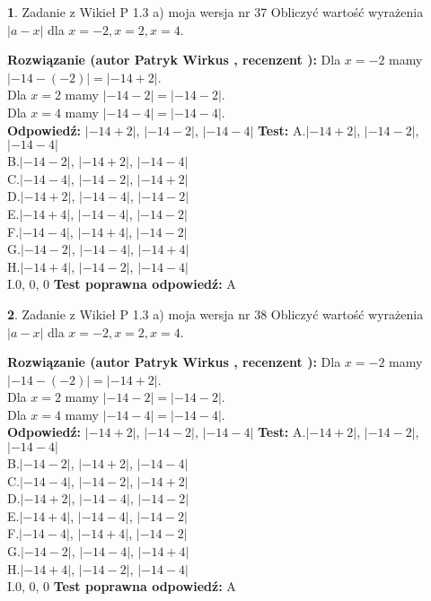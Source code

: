 \documentclass[12pt, a4paper]{article}
\theoremstyle{definition} %
\newtheorem{zad}{}
\newcommand{\zadStart}[1]{\begin{zad}#1\newline}
\newcommand{\zadStop}{\end{zad}}
\newcommand{\rozwStart}[2]{\noindent \textbf{Rozwiązanie (autor #1 , recenzent #2): }\newline}
\newcommand{\rozwStop}{\newline}
\newcommand{\odpStart}{\noindent \textbf{Odpowiedź:}\newline}
\newcommand{\odpStop}{\newline}
\newcommand{\testStart}{\noindent \textbf{Test:}\newline}
\newcommand{\testStop}{\newline}
\newcommand{\kluczStart}{\noindent \textbf{Test poprawna odpowiedź:}\newline}
\newcommand{\kluczStop}{\newline}
\begin{document}
\zadStart{Zadanie z Wikieł P 1.3 a) moja wersja nr 37}
Obliczyć wartość wyrażenia $|a - x|$ dla $x=-2,x=2,x=4$.
\zadStop
\rozwStart{Patryk Wirkus}{}
Dla $x = -2$ mamy $|-14 - (-2)| = |-14 + 2|$.\\
Dla $x = 2$ mamy $|-14 - 2| = |-14 - 2|$.\\
Dla $x = 4$ mamy $|-14 - 4| = |-14 - 4|$.\\
\rozwStop
\odpStart
$|-14 + 2|$, $|-14 - 2|$, $|-14 - 4|$
\odpStop
\testStart
A.$|-14 + 2|$, $|-14 - 2|$, $|-14 - 4|$\\
B.$|-14 - 2|$, $|-14 + 2|$, $|-14 - 4|$\\
C.$|-14 - 4|$, $|-14 - 2|$, $|-14 + 2|$\\
D.$|-14 + 2|$, $|-14 - 4|$, $|-14 - 2|$\\
E.$|-14 + 4|$, $|-14 - 4|$, $|-14 - 2|$\\
F.$|-14 - 4|$, $|-14 + 4|$, $|-14 - 2|$\\
G.$|-14 - 2|$, $|-14 - 4|$, $|-14 + 4|$\\
H.$|-14 + 4|$, $|-14 - 2|$, $|-14 - 4|$\\
I.$0$, $0$, $0$
\testStop
\kluczStart
A
\kluczStop



\zadStart{Zadanie z Wikieł P 1.3 a) moja wersja nr 38}
Obliczyć wartość wyrażenia $|a - x|$ dla $x=-2,x=2,x=4$.
\zadStop
\rozwStart{Patryk Wirkus}{}
Dla $x = -2$ mamy $|-14 - (-2)| = |-14 + 2|$.\\
Dla $x = 2$ mamy $|-14 - 2| = |-14 - 2|$.\\
Dla $x = 4$ mamy $|-14 - 4| = |-14 - 4|$.\\
\rozwStop
\odpStart
$|-14 + 2|$, $|-14 - 2|$, $|-14 - 4|$
\odpStop
\testStart
A.$|-14 + 2|$, $|-14 - 2|$, $|-14 - 4|$\\
B.$|-14 - 2|$, $|-14 + 2|$, $|-14 - 4|$\\
C.$|-14 - 4|$, $|-14 - 2|$, $|-14 + 2|$\\
D.$|-14 + 2|$, $|-14 - 4|$, $|-14 - 2|$\\
E.$|-14 + 4|$, $|-14 - 4|$, $|-14 - 2|$\\
F.$|-14 - 4|$, $|-14 + 4|$, $|-14 - 2|$\\
G.$|-14 - 2|$, $|-14 - 4|$, $|-14 + 4|$\\
H.$|-14 + 4|$, $|-14 - 2|$, $|-14 - 4|$\\
I.$0$, $0$, $0$
\testStop
\kluczStart
A
\kluczStop
\end{document}
